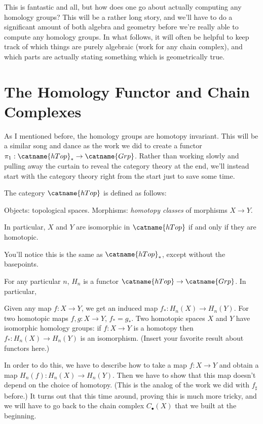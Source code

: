 This is fantastic and all, but how does one go about actually computing any homology groups?
This will be a rather long story, and we'll have to do a significant amount of both algebra and geometry
before we're really able to compute any homology groups.
In what follows, it will often be helpful to keep track of which things are purely algebraic
(work for any chain complex), and which parts are actually stating something which is geometrically true.

\section{The Homology Functor and Chain Complexes}
As I mentioned before, the homology groups are homotopy invariant.
This will be a similar song and dance as the work we did to
create a functor $\pi_1 : \catname{hTop}_\ast \to \catname{Grp}$.
Rather than working slowly and pulling away the curtain to reveal the category theory at the end,
we'll instead start with the category theory right from the start just to save some time.

\begin{definition}
	The category $\catname{hTop}$ is defined as follows:
	\begin{itemize}
		\ii Objects: topological spaces.
		\ii Morphisms: \emph{homotopy classes} of morphisms $X \to Y$.
	\end{itemize}
	In particular, $X$ and $Y$ are isomorphic in $\catname{hTop}$
	if and only if they are homotopic.
\end{definition}
You'll notice this is the same as $\catname{hTop}_\ast$,
except without the basepoints.

\begin{theorem}
	\label{thm:Hn_functor}
	For any particular $n$, $H_n$ is a functor $\catname{hTop} \to \catname{Grp}$.
	In particular,
	\begin{itemize}
		\ii Given any map $f : X \to Y$, we get an induced map $f_\ast : H_n(X) \to H_n(Y)$.
		\ii For two homotopic maps $f, g : X \to Y$, $f_\ast = g_\ast$.
		\ii Two homotopic spaces $X$ and $Y$ have isomorphic homology groups:
		if $f : X \to Y$ is a homotopy then $f_\ast : H_n(X) \to H_n(Y)$ is an isomorphism.
		\ii (Insert your favorite result about functors here.)
	\end{itemize}
\end{theorem}

In order to do this, we have to describe how to take a map $f : X \to Y$
and obtain a map $H_n(f) : H_n(X) \to H_n(Y)$.
Then we have to show that this map doesn't depend on the choice of homotopy.
(This is the analog of the work we did with $f_\sharp$ before.)
It turns out that this time around, proving this is much more tricky,
and we will have to go back to the chain complex $C_\bullet(X)$ that we built at the beginning.

